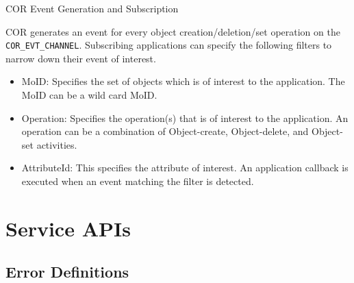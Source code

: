 \begin{flushleft}
\begin{Desc}
\item
[COR Event Generation and Subscription]\end{Desc}
COR generates an event for every object creation/deletion/set operation on the {\tt{COR\_\-EVT\_\-CHANNEL}}. Subscribing applications can specify the 
following filters to narrow down their event of interest.
\begin{itemize}
\item
MoID: Specifies the set of objects which is of interest to the application. The MoID can be a wild card MoID.
\item
Operation: Specifies the operation(s) that is of interest to the application. An operation can be a combination of Object-create, Object-delete, and 
Object-set activities.
\item
AttributeId: This specifies the attribute of interest. An application callback is executed when an event matching the filter is detected. 
\end{itemize}





\chapter{Service APIs}



\section{Error Definitions}

\begin{CompactItemize}


\end{CompactItemize}
\end{flushleft}
